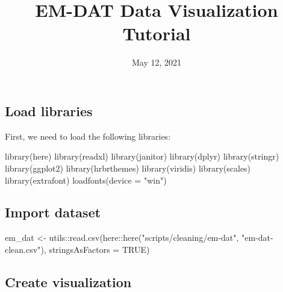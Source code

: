 \documentclass[
  12pt,
]{article}
\title{EM-DAT Data Visualization Tutorial}
\author{}
\date{\vspace{-2.5em}May 12, 2021}
\newenvironment{Shaded}{}{}
\newcommand{\AttributeTok}[1]{\textcolor[rgb]{0.49,0.56,0.16}{#1}}
\newcommand{\ConstantTok}[1]{\textcolor[rgb]{0.53,0.00,0.00}{#1}}
\newcommand{\FunctionTok}[1]{\textcolor[rgb]{0.02,0.16,0.49}{#1}}
\newcommand{\NormalTok}[1]{#1}
\newcommand{\OtherTok}[1]{\textcolor[rgb]{0.00,0.44,0.13}{#1}}
\newcommand{\SpecialCharTok}[1]{\textcolor[rgb]{0.25,0.44,0.63}{#1}}
\newcommand{\StringTok}[1]{\textcolor[rgb]{0.25,0.44,0.63}{#1}}
\renewcommand\maketitle{}
\begin{document}
\maketitle

\hypertarget{load-libraries}{%
\subsection{Load libraries}\label{load-libraries}}

First, we need to load the following libraries:

\begin{Shaded}
\begin{Highlighting}[]
\FunctionTok{library}\NormalTok{(here)}
\FunctionTok{library}\NormalTok{(readxl)}
\FunctionTok{library}\NormalTok{(janitor)}
\FunctionTok{library}\NormalTok{(dplyr)}
\FunctionTok{library}\NormalTok{(stringr)}
\FunctionTok{library}\NormalTok{(ggplot2)}
\FunctionTok{library}\NormalTok{(hrbrthemes)}
\FunctionTok{library}\NormalTok{(viridis)}
\FunctionTok{library}\NormalTok{(scales)}
\FunctionTok{library}\NormalTok{(extrafont)}
\FunctionTok{loadfonts}\NormalTok{(}\AttributeTok{device =} \StringTok{"win"}\NormalTok{)}
\end{Highlighting}
\end{Shaded}

\hypertarget{import-dataset}{%
\subsection{Import dataset}\label{import-dataset}}

\begin{Shaded}
\begin{Highlighting}[]
\NormalTok{em\_dat }\OtherTok{\textless{}{-}}\NormalTok{ utils}\SpecialCharTok{::}\FunctionTok{read.csv}\NormalTok{(here}\SpecialCharTok{::}\FunctionTok{here}\NormalTok{(}\StringTok{"scripts/cleaning/em{-}dat"}\NormalTok{, }
    \StringTok{"em{-}dat{-}clean.csv"}\NormalTok{), }\AttributeTok{stringsAsFactors =} \ConstantTok{TRUE}\NormalTok{)}
\end{Highlighting}
\end{Shaded}

\hypertarget{create-visualization}{%
\subsection{Create visualization}\label{create-visualization}}
\end{document}

